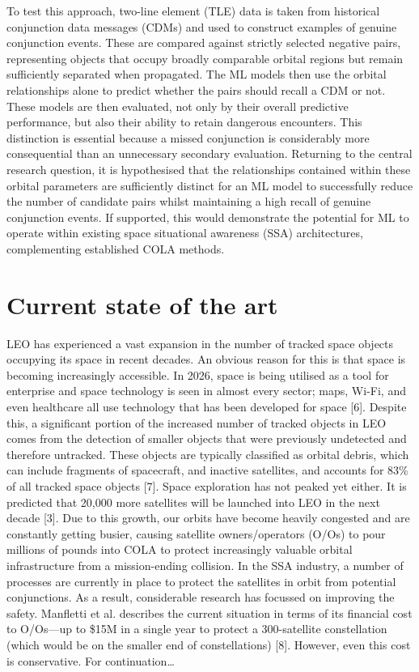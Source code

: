 \documentclass[letterpaper,11pt,leqno]{article}
\begin{document}
To test this approach, two-line element (TLE) data is taken from historical conjunction data messages (CDMs) and used to construct examples of genuine conjunction events. These are compared against strictly selected negative pairs, representing objects that occupy broadly comparable orbital regions but remain sufficiently separated when propagated. The ML models then use the orbital relationships alone to predict whether the pairs should recall a CDM or not. These models are then evaluated, not only by their overall predictive performance, but also their ability to retain dangerous encounters. This distinction is essential because a missed conjunction is considerably more consequential than an unnecessary secondary evaluation. 
Returning to the central research question, it is hypothesised that the relationships contained within these orbital parameters are sufficiently distinct for an ML model to successfully reduce the number of candidate pairs whilst maintaining a high recall of genuine conjunction events. If supported, this would demonstrate the potential for ML to operate within existing space situational awareness (SSA) architectures, complementing established COLA methods.


\section{Current state of the art}\label{s:section}

LEO has experienced a vast expansion in the number of tracked space objects occupying its space in recent decades. An obvious reason for this is that space is becoming increasingly accessible. In 2026, space is being utilised as a tool for enterprise and space technology is seen in almost every sector; maps, Wi-Fi, and even healthcare all use technology that has been developed for space [6]. Despite this, a significant portion of the increased number of tracked objects in LEO comes from the detection of smaller objects that were previously undetected and therefore untracked. These objects are typically classified as orbital debris, which can include fragments of spacecraft, and inactive satellites, and accounts for 83\% of all tracked space objects [7]. Space exploration has not peaked yet either. It is predicted that 20,000 more satellites will be launched into LEO in the next decade [3]. 
Due to this growth, our orbits have become heavily congested and are constantly getting busier, causing satellite owners/operators (O/Os) to pour millions of pounds into COLA to protect increasingly valuable orbital infrastructure from a mission-ending collision. In the SSA industry, a number of processes are currently in place to protect the satellites in orbit from potential conjunctions. As a result, considerable research has focussed on improving the safety. Manfletti et al. describes the current situation in terms of its financial cost to O/Os—up to \$15M in a single year to protect a 300-satellite constellation (which would be on the smaller end of constellations) [8]. However, even this cost is conservative. 
For continuation…
\end{document}
